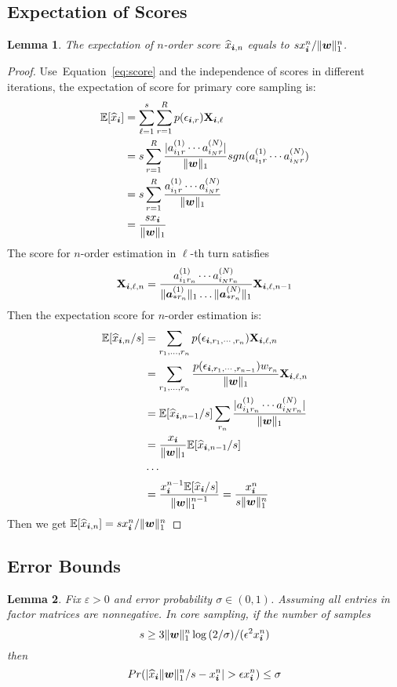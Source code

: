 \documentclass[letterpaper]{article}
\newcommand{\Sca}[3]{{#1}^{(#2)}_{i_#2#3}}%
\newcommand{\V}[1]{{\bm{{\MakeLowercase{#1}}}}}
\newcommand{\VnC}[3]{\V{#1}^{(#2)}_{#3}}
\newcommand{\Nrocl}[2]{\norm{\VnC{a}{#1}{*#2}}{1}}
\newcommand{\M}[1]{{\bm{\mathbf{\MakeUppercase{#1}}}}}
\newcommand{\norm}[2]{\|#1\|_{#2}}
\newcommand{\Eqn}[1]   {Equation~\ref{eq:#1}}
\newcommand{\predx}{\widehat{x}_{\V{i}}}
\newtheorem{lemma}{Lemma}
\begin{document}
\subsection{Expectation of Scores}
\begin{lemma}\label{lem:Expectation}
The expectation of $n$-order score $\widehat{x}_{\V{i},n}$ equals to $sx_{\V{i}}^n/\norm{\V{w}}{1}^n$.
\end{lemma}
\begin{proof} Use~\Eqn{score} and the independence of scores in different iterations,
     the expectation of score for primary core sampling is:
\begin{align*}
\mathbb{E}[\predx]
& =\sum_{\ell=1}^{s}\sum_{r=1}^{R} p(\epsilon_{\V{i},r})\M{X}_{\V{i},\ell}\\
& = s\sum_{r=1}^{R} \frac{|\Sca{a}{1}{r}\cdots\Sca{a}{N}{r}|}{\norm{\V{W}}{1}}sgn(\Sca{a}{1}{r}\cdots\Sca{a}{N}{r})\\
& = s\sum_{r=1}^{R} \frac{\Sca{a}{1}{r}\cdots\Sca{a}{N}{r}}{\norm{\V{W}}{1}}\\
& = \frac{sx_{\V{i}}}{\norm{\V{w}}{1}}
\end{align*}
The score for $n$-order estimation in $\ell$-th turn satisfies
\[
\M{X}_{\V{i},\ell,n}  = \frac{\Sca{a}{1}{r_n}\cdots\Sca{a}{N}{r_n}}{\Nrocl{1}{r_n}\ldots\Nrocl{N}{r_n}}
\M{X}_{\V{i},\ell,n-1}
\]
Then the expectation score for $n$-order estimation is:
\begin{align*}
\mathbb{E}[\widehat{x}_{\V{i},n}/s]
& = \sum_{r_1,\ldots,r_n} p(\epsilon_{\V{i},r_1,\cdots,r_n})\M{X}_{\V{i},\ell,n}\\
& = \sum_{r_1,\ldots,r_n}
\frac{p(\epsilon_{\V{i},r_1,\cdots,r_{n-1}})w_{r_n}}{\norm{\V{w}}{1}}\M{X}_{\V{i},\ell,n}\\
& = \mathbb{E}[\widehat{x}_{\V{i},n-1}/s]\sum_{r_n}\frac{|\Sca{a}{1}{r_n}\cdots\Sca{a}{N}{r_n}|}{\norm{\V{w}}{1}}\\
& = \frac{x_{\V{i}}}{\norm{\V{w}}{1}}\mathbb{E}[\widehat{x}_{\V{i},n-1}/s]\\
& \cdots \\
& = \frac{x^{n-1}_{\V{i}}\mathbb{E}[\predx/s]}{\norm{\V{w}}{1}^{n-1}}
= \frac{x^n_{\V{i}}}{s\norm{\V{w}}{1}^n}
\end{align*}
Then we get $\mathbb{E}[\widehat{x}_{\V{i},n}] = sx^n_{\V{i}}/\norm{\V{w}}{1}^n$
\end{proof}

\subsection{Error Bounds}
\begin{lemma}\label{lem:Bound}
Fix $\varepsilon > 0$ and error probability $\sigma \in (0,1)$.
Assuming all entries in factor matrices are nonnegative.
In core sampling, if the number of samples
\[
    s \geq 3\norm{\V{w}}{1}^n\log{(2/\sigma)}/(\epsilon^2 x^n_{\V{i}})
\]
then
\[
    Pr(|\predx\norm{\V{W}}{1}^n/s - x^n_{\V{i}}| > \epsilon x^n_{\V{i}}) \leq \sigma
\]
\end{lemma}
\end{document}
